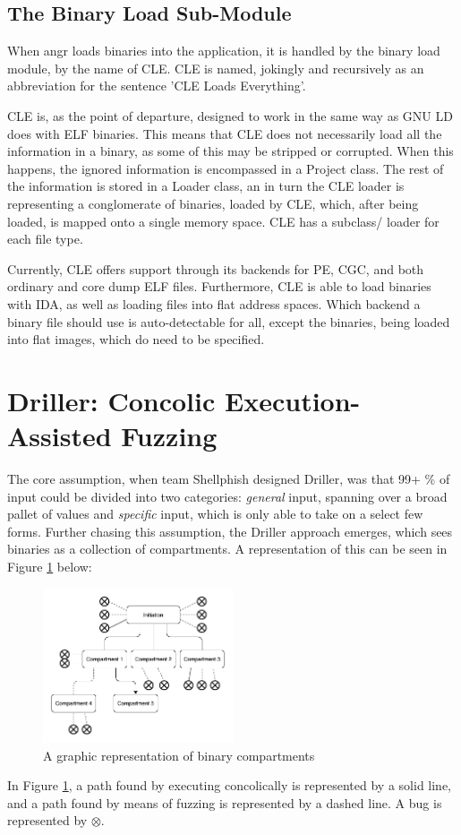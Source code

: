 \documentclass[a4paper]{article}
\newcommand{\tit}[1]{\textit{#1}}
\begin{document}
\subsection{The Binary Load Sub-Module}
\label{sec:binaryLoader}
When angr loads binaries into the application, it is handled by the binary load module, by the name of CLE. CLE is named, jokingly and recursively as an abbreviation for the sentence 'CLE Loads Everything'.

CLE is, as the point of departure, designed to work in the same way as GNU LD does with ELF binaries. This means that CLE does not necessarily load all the information in a binary, as some of this may be stripped or corrupted. When this happens, the ignored information is encompassed in a Project class. The rest of the information is stored in a Loader class, an in turn the CLE loader is representing a conglomerate of binaries, loaded by CLE, which, after being loaded, is mapped onto a single memory space. CLE has a subclass/ loader for each file type.

Currently, CLE offers support through its backends for PE, CGC, and both ordinary and core dump ELF files. Furthermore, CLE is able to load binaries with IDA, as well as loading files into flat address spaces. Which backend a binary file should use is auto-detectable for all, except the binaries, being loaded into flat images, which do need to be specified.
\newpage
\section{Driller: Concolic Execution-Assisted Fuzzing}
\label{sec:Driller}
The core assumption, when team Shellphish designed Driller, was that 99+ \% of input could be divided into two categories: \tit{general} input, spanning over a broad pallet of values and \tit{specific} input, which is only able to take on a select few forms. Further chasing this assumption, the Driller approach emerges, which sees binaries as a collection of compartments. A representation of this can be seen in Figure \ref{Compartments} below:
\begin{figure}[H]
	\centering
	\includegraphics[width=0.5\textwidth]{Compartments}
	\caption{A graphic representation of binary compartments}
	\label{Compartments}
\end{figure}
\noindent
In Figure \ref{Compartments}, a path found by executing concolically is represented by a solid line, and a path found by means of fuzzing is represented by a dashed line. A bug is represented by $\otimes$. 
\end{document}
